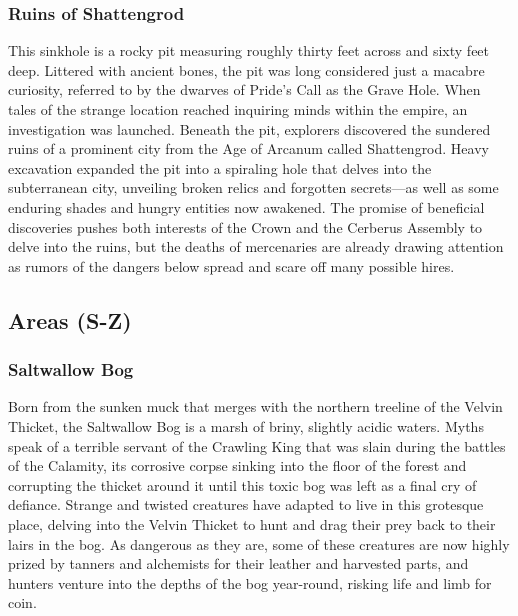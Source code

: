 \documentclass[10pt,a4paper,twoside,bg=print,twocolumn,openany,nodeprecatedcode]{dndbook}
\begin{document}
\subsubsection{Ruins of Shattengrod}
This sinkhole is a rocky pit measuring roughly thirty feet across and sixty feet deep. Littered with ancient bones, the pit was long considered just a macabre curiosity, referred to by the dwarves of Pride's Call as the Grave Hole. When tales of the strange location reached inquiring minds within the empire, an investigation was launched. Beneath the pit, explorers discovered the sundered ruins of a prominent city from the Age of Arcanum called Shattengrod. Heavy excavation expanded the pit into a spiraling hole that delves into the subterranean city, unveiling broken relics and forgotten secrets—as well as some enduring shades and hungry entities now awakened. The promise of beneficial discoveries pushes both interests of the Crown and the Cerberus Assembly to delve into the ruins, but the deaths of mercenaries are already drawing attention as rumors of the dangers below spread and scare off many possible hires.

\subsection{Areas (S-Z)}
\subsubsection{Saltwallow Bog}
Born from the sunken muck that merges with the northern treeline of the Velvin Thicket, the Saltwallow Bog is a marsh of briny, slightly acidic waters. Myths speak of a terrible servant of the Crawling King that was slain during the battles of the Calamity, its corrosive corpse sinking into the floor of the forest and corrupting the thicket around it until this toxic bog was left as a final cry of defiance. Strange and twisted creatures have adapted to live in this grotesque place, delving into the Velvin Thicket to hunt and drag their prey back to their lairs in the bog. As dangerous as they are, some of these creatures are now highly prized by tanners and alchemists for their leather and harvested parts, and hunters venture into the depths of the bog year-round, risking life and limb for coin.
\end{document}
